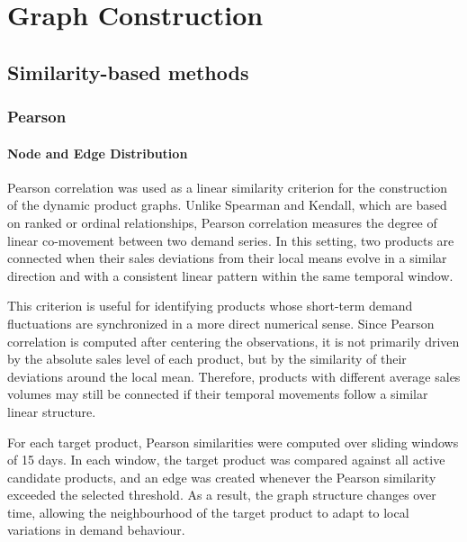 \chapter{Graph Construction}


\section{Similarity-based methods}
\subsection{Pearson}
\label{subsec:pearson_graphs}

\subsubsection{Node and Edge Distribution}
\label{subsubsec:pearson_node_edge_distribution}

Pearson correlation was used as a linear similarity criterion for the construction of the dynamic product graphs. Unlike Spearman and Kendall, which are based on ranked or ordinal relationships, Pearson correlation measures the degree of linear co-movement between two demand series. In this setting, two products are connected when their sales deviations from their local means evolve in a similar direction and with a consistent linear pattern within the same temporal window.

This criterion is useful for identifying products whose short-term demand fluctuations are synchronized in a more direct numerical sense. Since Pearson correlation is computed after centering the observations, it is not primarily driven by the absolute sales level of each product, but by the similarity of their deviations around the local mean. Therefore, products with different average sales volumes may still be connected if their temporal movements follow a similar linear structure.

For each target product, Pearson similarities were computed over sliding windows of 15 days. In each window, the target product was compared against all active candidate products, and an edge was created whenever the Pearson similarity exceeded the selected threshold. As a result, the graph structure changes over time, allowing the neighbourhood of the target product to adapt to local variations in demand behaviour.

